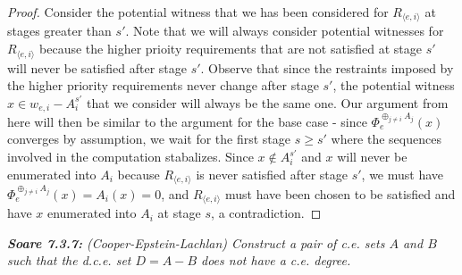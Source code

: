 \documentclass{article}
\begin{document}
\begin{enumerate}[label={(\roman*)}]
\begin{proof}
        Consider the potential witness that we has been considered for
        $R_{\langle e,i\rangle}$ at stages greater than $s'$. Note that we
        will always consider potential witnesses for $R_{\langle
        e,i\rangle}$ because the higher prioity requirements that are not
        satisfied at stage $s'$ will never be satisfied after stage $s'$.
        Observe that since the restraints imposed by the higher priority
        requirements never change after stage $s'$, the potential witness
        $x\in w_{e,i}-A_i^{s'}$ that we consider will always be the same
        one. Our argument from here will then be similar to the argument
        for the base case - since $\Phi_e^{\oplus_{j\neq i} A_j}(x)$
        converges by assumption, we wait for the first stage $s\geq s'$
        where the sequences involved in the computation stabalizes. Since
        $x\not\in A_i^{s'}$ and $x$ will never be enumerated into $A_i$
        because $R_{\langle e,i\rangle}$ is never satisfied after stage
        $s'$, we must have $\Phi_e^{\oplus_{j\neq i} A_j}(x)=A_i(x)=0$, and
        $R_{\langle e,i\rangle}$ must have been chosen to be satisfied and
        have $x$ enumerated into $A_i$ at stage $s$, a contradiction.
      \end{proof}
  \end{enumerate}

\it \textbf{Soare 7.3.7:} (Cooper-Epstein-Lachlan) Construct a pair of c.e.
  sets $A$ and $B$ such that the d.c.e. set $D=A-B$ does not have a c.e.
  degree.
\end{document}

